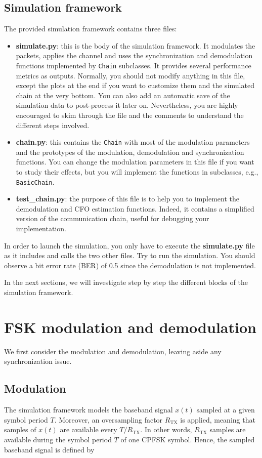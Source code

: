 \subsection{Simulation framework}
The provided simulation framework contains three files:
\begin{itemize}
    \item \textbf{simulate.py}: this is the body of the simulation framework. It modulates the packets, applies the channel and uses the synchronization and demodulation functions implemented by \texttt{Chain} subclasses. It provides several performance metrics as outputs. Normally, you should not modify anything in this file, except the plots at the end if you want to customize them and the simulated chain at the very bottom. You can also add an automatic save of the simulation data to post-process it later on. Nevertheless, you are highly encouraged to skim through the file and the comments to understand the different steps involved.
    \item \textbf{chain.py}: this contains the \texttt{Chain} with most of the modulation parameters and the prototypes of the modulation, demodulation and synchronization functions. You can change the modulation parameters in this file if you want to study their effects, but you will implement the functions in subclasses, e.g., \texttt{BasicChain}.
    \item \textbf{test_chain.py}: the purpose of this file is to help you to implement the demodulation and CFO estimation functions. Indeed, it contains a simplified version of the communication chain, useful for debugging your implementation.
\end{itemize}

In order to launch the simulation, you only have to execute the \textbf{simulate.py} file as it includes and calls the two other files. Try to run the simulation. You should observe a bit error rate (BER) of 0.5 since the demodulation is not implemented.

In the next sections, we will investigate step by step the different blocks of the simulation framework.

\section{FSK modulation and demodulation}
We first consider the modulation and demodulation, leaving aside any synchronization issue.

\subsection{Modulation}
The simulation framework models the baseband signal $x(t)$ sampled at a given symbol period $T$. Moreover, an oversampling factor $R_{\text{TX}}$ is applied, meaning that samples of $x(t) $ are available every $T/R_{\text{TX}}$. In other words, $R_{\text{TX}}$ samples are available during the symbol period $T$ of one CPFSK symbol. Hence, the sampled baseband signal is defined by

